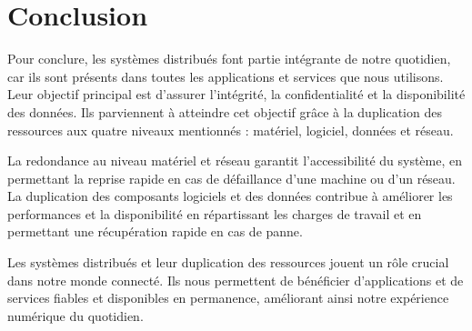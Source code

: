 \documentclass[a11paper, 11pt]{article}
\begin{document}
\section{Conclusion}

Pour conclure, les systèmes distribués font partie intégrante de notre
quotidien, car ils sont présents dans toutes les applications et services que
nous utilisons. Leur objectif principal est d'assurer l'intégrité, la
confidentialité et la disponibilité des données. Ils parviennent à atteindre
cet objectif grâce à la duplication des ressources aux quatre niveaux
mentionnés : matériel, logiciel, données et réseau.

La redondance au niveau matériel et réseau garantit l'accessibilité du système,
en permettant la reprise rapide en cas de défaillance d'une machine ou d'un
réseau. La duplication des composants logiciels et des données contribue à
améliorer les performances et la disponibilité en répartissant les charges de
travail et en permettant une récupération rapide en cas de panne.

Les systèmes distribués et leur duplication des ressources jouent un rôle
crucial dans notre monde connecté. Ils nous permettent de bénéficier
d'applications et de services fiables et disponibles en permanence, améliorant
ainsi notre expérience numérique du quotidien.

\end{document}
